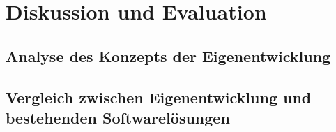 \chapter{Diskussion und Evaluation}
\label{chap:evaluation}
\section{Analyse des Konzepts der Eigenentwicklung}
\section{Vergleich zwischen Eigenentwicklung und bestehenden Softwarelösungen}